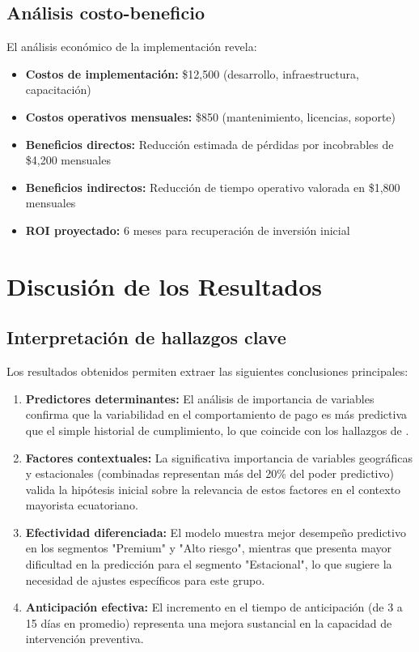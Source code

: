 \subsection{Análisis costo-beneficio}
El análisis económico de la implementación revela:

\begin{itemize}
    \item \textbf{Costos de implementación:} \$12,500 (desarrollo, infraestructura, capacitación)
    
    \item \textbf{Costos operativos mensuales:} \$850 (mantenimiento, licencias, soporte)
    
    \item \textbf{Beneficios directos:} Reducción estimada de pérdidas por incobrables de \$4,200 mensuales
    
    \item \textbf{Beneficios indirectos:} Reducción de tiempo operativo valorada en \$1,800 mensuales
    
    \item \textbf{ROI proyectado:} 6 meses para recuperación de inversión inicial
\end{itemize}

\section{Discusión de los Resultados}
\subsection{Interpretación de hallazgos clave}
Los resultados obtenidos permiten extraer las siguientes conclusiones principales:

\begin{enumerate}
    \item \textbf{Predictores determinantes:} El análisis de importancia de variables confirma que la variabilidad en el comportamiento de pago es más predictiva que el simple historial de cumplimiento, lo que coincide con los hallazgos de \cite{torres2023inteligencia}.
    
    \item \textbf{Factores contextuales:} La significativa importancia de variables geográficas y estacionales (combinadas representan más del 20\% del poder predictivo) valida la hipótesis inicial sobre la relevancia de estos factores en el contexto mayorista ecuatoriano.
    
    \item \textbf{Efectividad diferenciada:} El modelo muestra mejor desempeño predictivo en los segmentos "Premium" y "Alto riesgo", mientras que presenta mayor dificultad en la predicción para el segmento "Estacional", lo que sugiere la necesidad de ajustes específicos para este grupo.
    
    \item \textbf{Anticipación efectiva:} El incremento en el tiempo de anticipación (de 3 a 15 días en promedio) representa una mejora sustancial en la capacidad de intervención preventiva.
\end{enumerate}

